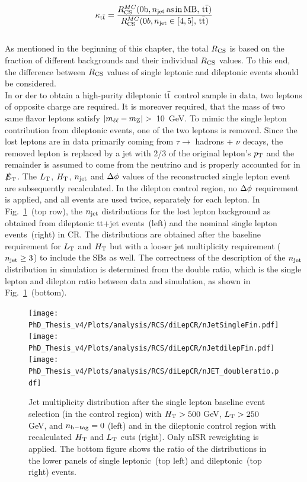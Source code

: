 \begin{equation}
\label{eq:kappatt}
{\kappa_{\ensuremath{\rm t\bar{t}}}} = \frac{R_{\rm CS}^{MC}({\rm 0b} , n_{\rm jet} {\rm \,as\,in\,MB}, \,\rm t\bar{t} )}{R_{\rm CS}^{MC}(0b , n_{\rm jet} \in [4,5], \,\rm t\bar{t} )} 
\end{equation}
\\
As mentioned in the beginning of this chapter, the total $R_{\rm CS}$ is based on the fraction of different backgrounds and their individual $R_{\rm CS}$ values. To this end, the difference between $R_{\rm CS}$ values of single leptonic and dileptonic events should be considered.\\
In or der to obtain a high-purity dileptonic $\rm t\bar{t}$ control sample in data, two leptons of opposite charge are required. It is moreover required, that the mass of two same flavor leptons satisfy $|m_{\ell\ell}-m_{\rm Z}|>$~10~GeV. To mimic the single lepton contribution from dileptonic events, one of the two leptons is removed. 
Since the lost leptons are in data primarily coming from $\tau \rightarrow$ hadrons + $\nu$ decays, the removed lepton is replaced by a jet with 2/3 of the original lepton's $p_{\rm T}$ and the remainder is assumed to come from the neutrino and is properly accounted for in $\slashed{E}_{\rm T}$. The $L_{\rm T}$, $H_{\rm T}$, $\njet$ and $\Delta \phi$ values of the reconstructed single lepton event are subsequently recalculated.
In the dilepton control region, no $\Delta \phi$ requirement is applied, and all events are used twice, separately for each lepton.
In Fig.~\ref{dl-CR}~(top row), the $\njet$ distributions for the lost lepton background as obtained from dileptonic tt+jet events~(left) and the nominal single lepton events~(right) in CR. The distributions are obtained after the baseline requirement for $L_{\rm T}$ and $H_{\rm T}$ but with a looser jet multiplicity requirement ($n_{\rm jet} \geq 3$) to include the SBs as well. The correctness of the description of the $\njet$ distribution in simulation is determined from the double ratio, which is the single lepton and dilepton ratio between data and simulation, as shown in Fig.~\ref{dl-CR}~(bottom).
\begin{figure}[!hbt]
    \begin{center}
 \texttt{[image: PhD\_Thesis\_v4/Plots/analysis/RCS/diLepCR/nJetSingleFin.pdf]}
 \texttt{[image: PhD\_Thesis\_v4/Plots/analysis/RCS/diLepCR/nJetdilepFin.pdf]}\\
    \texttt{[image: PhD\_Thesis\_v4/Plots/analysis/RCS/diLepCR/nJET\_doubleratio.pdf]}
  \caption[Double Ratio of $\njet$ distributions]{ \label{dl-CR} Jet multiplicity distribution after the single lepton baseline event selection (in the control region)
 with $H_{\rm T}>500$ GeV, $L_{\rm T}>250$ GeV, and $n_{\rm b-tag} = 0$ (left) and in the dileptonic control region with recalculated $H_{\rm T}$ and $L_{\rm T}$ cuts (right). Only nISR reweighting is applied. The bottom figure shows the ratio of the distributions in the lower panels of single leptonic~(top left) and dileptonic~(top right) events.}
  \end{center}
\end{figure}
